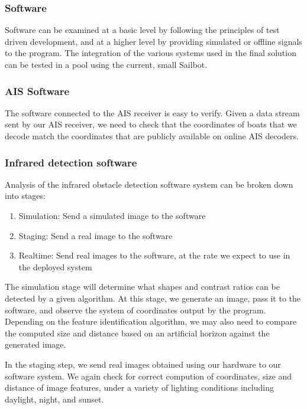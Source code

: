 \subsubsection{\label{sec:method:proposed-analysis:software}Software}
Software can be examined at a basic level by following the principles of test driven development, and at a higher level by providing simulated or offline signals to the program. The integration of the various systems used in the final solution can be tested in a pool using the current, small Sailbot.

\subsubsection{\label{sec:method:proposed-analysis:ais-software}AIS Software}

The software connected to the AIS receiver is easy to verify. Given a data stream sent by our AIS receiver, we need to check that the coordinates of boats that we decode match the coordinates that are publicly available on online AIS decoders.

\subsubsection{\label{sec:method:proposed-analysis:infrared-software}Infrared detection software}

Analysis of the infrared obstacle detection software system can be broken down into stages:
\begin{enumerate}
\item Simulation: Send a simulated image to the software
\item Staging: Send a real image to the software
\item Realtime: Send real images to the software, at the rate we expect to use in the deployed system
\end{enumerate}

The simulation stage will determine what shapes and contrast ratios can be detected by a given algorithm. At this stage, we generate an image, pass it to the software, and observe the system of coordinates output by the program. Depending on the feature identification algorithm, we may also need to compare the computed size and distance based on an artificial horizon against the generated image.

In the staging step, we send real images obtained using our hardware to our software system. We again check for correct compution of coordinates, size and distance of image features, under a variety of lighting conditions including daylight, night, and sunset.

